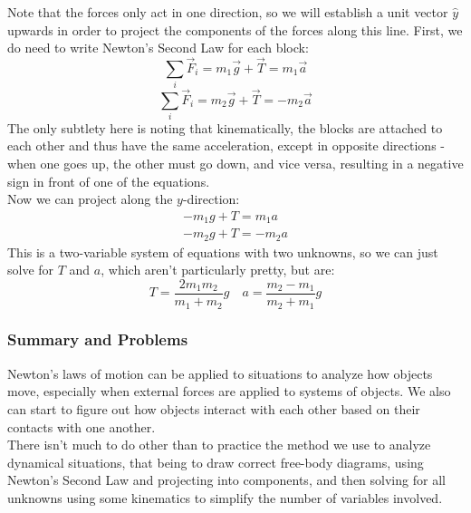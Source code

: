 Note that the forces only act in one direction, so we will establish a unit vector $\hat y$ upwards in order to project the components of the forces along this line. First, we do need to write Newton's Second Law for each block: 
\[
	\sum_i \vec F_i = m_1 \vec g + \vec T = m_1 \vec a
\]
\[
	\sum_i \vec F_i = m_2 \vec g + \vec T = -m_2 \vec a
\]
The only subtlety here is noting that kinematically, the blocks are attached to each other and thus have the same acceleration, except in opposite directions - when one goes up, the other must go down, and vice versa, resulting in a negative sign in front of one of the equations. \\
Now we can project along the $y$-direction:
\begin{align*}
-m_1g + T = m_1a \\
-m_2g + T = -m_2a
\end{align*}
This is a two-variable system of equations with two unknowns, so we can just solve for $T$ and $a$, which aren't particularly pretty, but are:
\[
	T = \frac{2m_1m_2}{m_1+m_2}g \quad a = \frac{m_2-m_1}{m_2+m_1}g
\]

\subsubsection{Summary and Problems}
Newton's laws of motion can be applied to situations to analyze how objects move, especially when external forces are applied to systems of objects. We also can start to figure out how objects interact with each other based on their contacts with one another. \\
There isn't much to do other than to practice the method we use to analyze dynamical situations, that being to draw correct free-body diagrams, using Newton's Second Law and projecting into components, and then solving for all unknowns using some kinematics to simplify the number of variables involved.  \\

